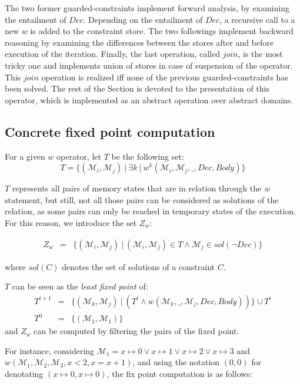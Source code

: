 \documentclass[submission,copyright,creativecommons]{eptcs}
\newcommand{\M}{\mathcal{M}}
\begin{document}
\noindent
The two former guarded-constraints implement forward analysis, by examining the entailment of $Dec$. Depending on the entailment of $Dec$, a recursive call to a new $w$ is added to the constraint store. The two followings implement backward reasoning by examining the differences between the stores after and before execution of the iteration. Finally,  the last operation, called $join$, is the most tricky one and implements union of stores in case of suspension of the operator. This $join$ operation is realized iff none of the previous guarded-constraints has been solved.
The rest of the Section is devoted to the presentation of this operator, which is implemented as an abstract operation over abstract domains. 


\subsection{Concrete fixed point computation}
For a given $w$ operator, let $T$ be the following set:
\begin{displaymath}
T = \{ (\M_i,\M_j)~|~\exists k~|~w^k(\M_i, \M_j,\_, Dec, Body) \}
\end{displaymath}

\noindent
$T$ represents all pairs of memory states that are in relation through the {\it w} statement, but still, not all those pairs can be considered as solutions of the relation, as some pairs can only be reached in temporary states of the execution. For this reason, we introduce the set $Z_w$:

  \begin{eqnarray*}
  Z_w &=& \{(\M_i,\M_j)~|~ (\M_i,\M_j) \in T \land \M_j \in sol(\lnot Dec)\} 
  \end{eqnarray*}

\noindent
  where $sol(C)$ denotes the set of solutions of a constraint $C$.

\noindent
$T$ can be seen as the {\it least fixed point} of:
\begin{eqnarray}
T^{i+1} &= & \{(\M_k,\M_j)~|~(T^i \land w(\M_k, \_, \M_j,Dec, Body))\} \cup T^i \label{eqn:concrete1}\\
T^0 &= &\{(\M_1,\M_1)\}  \label{eqn:concrete2} 
\end{eqnarray}
and $Z_w$ can be computed by filtering the pairs of the fixed point.

\noindent
For instance, considering $\M_1 = x \mapsto 0 \vee x \mapsto 1 \vee x \mapsto 2 \vee x \mapsto 3$ and $w(\M_1,\M_2, \M_3, x < 2, x=x+1)$, and
using the notation $(0,0)$ for denotating $(x \mapsto 0, x \mapsto 0)$,
the fix point computation is as follows: 
\end{document}
